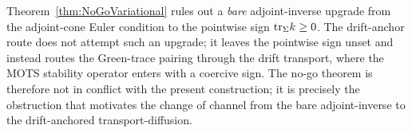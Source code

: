 \begin{remark}\label{rem:VsNoGo}
Theorem~\ref{thm:NoGoVariational} rules out a \emph{bare} adjoint-inverse upgrade from the adjoint-cone Euler condition to the pointwise sign $\mathrm{tr}_\Sigma k\ge0$. The drift-anchor route does not attempt such an upgrade; it leaves the pointwise sign unset and instead routes the Green-trace pairing through the drift transport, where the MOTS stability operator enters with a coercive sign. The no-go theorem is therefore not in conflict with the present construction; it is precisely the obstruction that motivates the change of channel from the bare adjoint-inverse to the drift-anchored transport-diffusion.
\end{remark}
